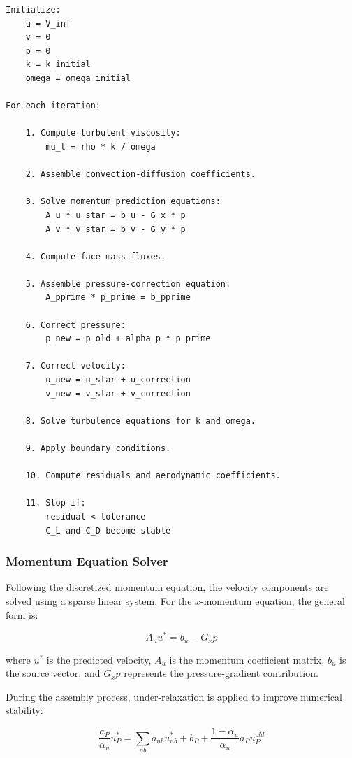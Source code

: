\documentclass[12pt,a4paper]{article}
\begin{document}
\begin{lstlisting}[style=cleanText, caption={SIMPLE outer iteration loop for the simplified CFD solver.}]
Initialize:
    u = V_inf
    v = 0
    p = 0
    k = k_initial
    omega = omega_initial

For each iteration:

    1. Compute turbulent viscosity:
        mu_t = rho * k / omega

    2. Assemble convection-diffusion coefficients.

    3. Solve momentum prediction equations:
        A_u * u_star = b_u - G_x * p
        A_v * v_star = b_v - G_y * p

    4. Compute face mass fluxes.

    5. Assemble pressure-correction equation:
        A_pprime * p_prime = b_pprime

    6. Correct pressure:
        p_new = p_old + alpha_p * p_prime

    7. Correct velocity:
        u_new = u_star + u_correction
        v_new = v_star + v_correction

    8. Solve turbulence equations for k and omega.

    9. Apply boundary conditions.

    10. Compute residuals and aerodynamic coefficients.

    11. Stop if:
        residual < tolerance
        C_L and C_D become stable
\end{lstlisting}

\subsubsection{Momentum Equation Solver}

Following the discretized momentum equation, the velocity components are solved using
a sparse linear system. For the $x$-momentum equation, the general form is:

\begin{equation}
    A_u u^* = b_u - G_x p
\end{equation}

where $u^*$ is the predicted velocity, $A_u$ is the momentum coefficient matrix, $b_u$
is the source vector, and $G_xp$ represents the pressure-gradient contribution.

During the assembly process, under-relaxation is applied to improve numerical stability:

\begin{equation}
    \frac{a_P}{\alpha_u}u_P^* = \sum_{nb}a_{nb}u_{nb}^* +b_P+\frac{1-\alpha_u}{\alpha_u}a_P u_P^{old}
\end{equation}
\end{document}
